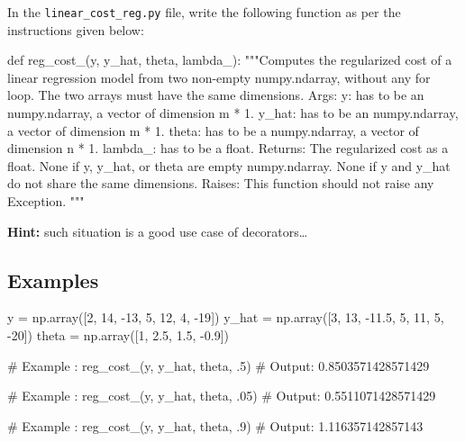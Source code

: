 \documentclass[]{article}
\newenvironment{Shaded}{\begin{snugshade}}{\end{snugshade}}
\newcommand{\CommentTok}[1]{\textcolor[rgb]{0.48,0.49,0.49}{#1}}
\newcommand{\DecValTok}[1]{\textcolor[rgb]{0.96,0.45,0.00}{#1}}
\newcommand{\FloatTok}[1]{\textcolor[rgb]{0.96,0.45,0.00}{#1}}
\newcommand{\KeywordTok}[1]{\textcolor[rgb]{0.81,0.81,0.76}{#1}}
\newcommand{\NormalTok}[1]{\textcolor[rgb]{0.81,0.81,0.76}{#1}}
\newcommand{\OperatorTok}[1]{\textcolor[rgb]{0.81,0.81,0.76}{#1}}
\begin{document}
In the \texttt{linear\_cost\_reg.py} file, write the following function
as per the instructions given below:

\begin{Shaded}
\begin{Highlighting}[]
\KeywordTok{def}\NormalTok{ reg_cost_(y, y_hat, theta, lambda_):}
    \CommentTok{"""Computes the regularized cost of a linear regression model from two non-empty numpy.ndarray, without any for loop. The two arrays must have the same dimensions.}
\CommentTok{    Args:}
\CommentTok{      y: has to be an numpy.ndarray, a vector of dimension m * 1.}
\CommentTok{      y_hat: has to be an numpy.ndarray, a vector of dimension m * 1.}
\CommentTok{      theta: has to be a numpy.ndarray, a vector of dimension n * 1.}
\CommentTok{      lambda_: has to be a float.}
\CommentTok{    Returns:}
\CommentTok{      The regularized cost as a float.}
\CommentTok{      None if y, y_hat, or theta are empty numpy.ndarray.}
\CommentTok{      None if y and y_hat do not share the same dimensions.}
\CommentTok{    Raises:}
\CommentTok{      This function should not raise any Exception.}
\CommentTok{    """}
\end{Highlighting}
\end{Shaded}

\textbf{Hint:} such situation is a good use case of decorators\ldots{}

\hypertarget{examples-4}{%
\subsection{Examples}\label{examples-4}}

\begin{Shaded}
\begin{Highlighting}[]
\NormalTok{y }\OperatorTok{=}\NormalTok{ np.array([}\DecValTok{2}\NormalTok{, }\DecValTok{14}\NormalTok{, }\DecValTok{-13}\NormalTok{, }\DecValTok{5}\NormalTok{, }\DecValTok{12}\NormalTok{, }\DecValTok{4}\NormalTok{, }\DecValTok{-19}\NormalTok{])}
\NormalTok{y_hat }\OperatorTok{=}\NormalTok{ np.array([}\DecValTok{3}\NormalTok{, }\DecValTok{13}\NormalTok{, }\FloatTok{-11.5}\NormalTok{, }\DecValTok{5}\NormalTok{, }\DecValTok{11}\NormalTok{, }\DecValTok{5}\NormalTok{, }\DecValTok{-20}\NormalTok{])}
\NormalTok{theta }\OperatorTok{=}\NormalTok{ np.array([}\DecValTok{1}\NormalTok{, }\FloatTok{2.5}\NormalTok{, }\FloatTok{1.5}\NormalTok{, }\FloatTok{-0.9}\NormalTok{])}

\CommentTok{# Example :}
\NormalTok{reg_cost_(y, y_hat, theta, }\FloatTok{.5}\NormalTok{)}
\CommentTok{# Output:}
\FloatTok{0.8503571428571429}

\CommentTok{# Example :}
\NormalTok{reg_cost_(y, y_hat, theta, }\FloatTok{.05}\NormalTok{)}
\CommentTok{# Output:}
\FloatTok{0.5511071428571429}

\CommentTok{# Example :}
\NormalTok{reg_cost_(y, y_hat, theta, }\FloatTok{.9}\NormalTok{)}
\CommentTok{# Output:}
\FloatTok{1.116357142857143}
\end{Highlighting}
\end{Shaded}
\end{document}
